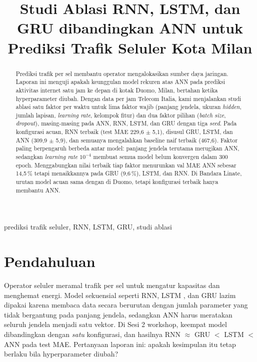 \documentclass[conference,a4paper]{IEEEtran}
\begin{document}
\title{Studi Ablasi RNN, LSTM, dan GRU dibandingkan ANN untuk Prediksi Trafik Seluler Kota Milan}

\author{
}

\maketitle

\begin{abstract}
Prediksi trafik per sel membantu operator mengalokasikan sumber daya jaringan. Laporan ini menguji apakah keunggulan model rekuren atas ANN pada prediksi aktivitas internet satu jam ke depan di kotak Duomo, Milan, bertahan ketika hyperparameter diubah. Dengan data per jam Telecom Italia, kami menjalankan studi ablasi satu faktor per waktu untuk lima faktor wajib (panjang jendela, ukuran \textit{hidden}, jumlah lapisan, \textit{learning rate}, kelompok fitur) dan dua faktor pilihan (\textit{batch size}, \textit{dropout}), masing-masing pada ANN, RNN, LSTM, dan GRU dengan tiga \textit{seed}. Pada konfigurasi acuan, RNN terbaik (test MAE 229,6 $\pm$ 5,1), disusul GRU, LSTM, dan ANN (309,9 $\pm$ 5,9), dan semuanya mengalahkan baseline naif terbaik (467,6). Faktor paling berpengaruh berbeda antar model: panjang jendela terutama merugikan ANN, sedangkan \textit{learning rate} $10^{-4}$ membuat semua model belum konvergen dalam 300 epoch. Menggabungkan nilai terbaik tiap faktor menurunkan val MAE ANN sebesar 14,5\,\% tetapi menaikkannya pada GRU (9,6\,\%), LSTM, dan RNN. Di Bandara Linate, urutan model acuan sama dengan di Duomo, tetapi konfigurasi terbaik hanya membantu ANN.
\end{abstract}

\begin{IEEEkeywords}
prediksi trafik seluler, RNN, LSTM, GRU, studi ablasi
\end{IEEEkeywords}

\section{Pendahuluan}
Operator seluler meramal trafik per sel untuk mengatur kapasitas dan menghemat energi. Model sekuensial seperti RNN, LSTM \cite{hochreiter1997lstm}, dan GRU \cite{cho2014gru} lazim dipakai karena membaca data secara berurutan dengan jumlah parameter yang tidak bergantung pada panjang jendela, sedangkan ANN harus meratakan seluruh jendela menjadi satu vektor. Di Sesi 2 workshop, keempat model dibandingkan dengan \emph{satu} konfigurasi, dan hasilnya RNN $\approx$ GRU $<$ LSTM $<$ ANN pada test MAE. Pertanyaan laporan ini: apakah kesimpulan itu tetap berlaku bila hyperparameter diubah?
\end{document}
